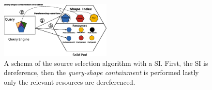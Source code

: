 \begin{figure}
    \centering
    \includegraphics[width=0.5\textwidth]{figure/shape_containement}
    \caption{A schema of the source selection algorithm with a SI. First, the SI is dereference, 
    then the \emph{query-shape containment} is performed lastly only the relevant resources are dereferenced.}
    \label{fig:shape_index}
\end{figure}